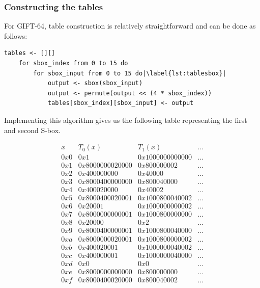 \subsubsection{Constructing the tables}

For GIFT-64, table construction is relatively straightforward and can
be done as follows:

\begin{lstlisting}[caption={Table construction algorithm}, label={lst:tables}, escapechar=|]
    tables <- [][]
    for sbox_index from 0 to 15 do
        for sbox_input from 0 to 15 do|\label{lst:tablesbox}|
            output <- sbox(sbox_input)
            output <- permute(output << (4 * sbox_index))
            tables[sbox_index][sbox_input] <- output
\end{lstlisting}

Implementing this algorithm gives us the following table representing the first
and second S-box.

\[
    \begin{array}{l|l|l|c}
        x & T_0(x) & T_1(x) & \dots \\
        \hline
        0x0 & 0x1               & 0x1000000000000   & \dots \\
        0x1 & 0x8000000020000   & 0x800000002       & \dots \\
        0x2 & 0x400000000       & 0x40000           & \dots \\
        0x3 & 0x8000400000000   & 0x800040000       & \dots \\
        0x4 & 0x400020000       & 0x40002           & \dots \\
        0x5 & 0x8000400020001   & 0x1000800040002   & \dots \\
        0x6 & 0x20001           & 0x1000000000002   & \dots \\
        0x7 & 0x8000000000001   & 0x1000800000000   & \dots \\
        0x8 & 0x20000           & 0x2               & \dots \\
        0x9 & 0x8000400000001   & 0x1000800040000   & \dots \\
        0xa & 0x8000000020001   & 0x1000800000002   & \dots \\
        0xb & 0x400020001       & 0x1000000040002   & \dots \\
        0xc & 0x400000001       & 0x1000000040000   & \dots \\
        0xd & 0x0               & 0x0               & \dots \\
        0xe & 0x8000000000000   & 0x800000000       & \dots \\
        0xf & 0x8000400020000   & 0x800040002       & \dots
    \end{array}
\]

